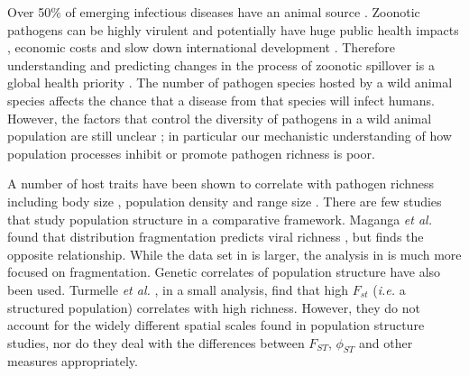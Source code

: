 Over 50\% of emerging infectious diseases have an animal source \cite{jones2008global, smith2014global}.
Zoonotic pathogens can be highly virulent \cite{luby2009recurrent, lefebvre2014case} and potentially have huge public health impacts \cite{granich2015trends}, economic costs \cite{knobler2004learning} and slow down international development \cite{ebolaWorldbank}.
Therefore understanding and predicting changes in the process of zoonotic spillover is a global health priority \cite{taylor2001risk}.
The number of pathogen species hosted by a wild animal species affects the chance that a disease from that species will infect humans.
However, the factors that control the diversity of pathogens in a wild animal population are still unclear \cite{metcalf2015five}; in particular our mechanistic understanding of how population processes inhibit or promote pathogen richness is poor.






A number of host traits have been shown to correlate with pathogen richness including body size \cite{kamiya2014determines, arneberg2002host}, population density \cite{nunn2003comparative, arneberg2002host} and range size \cite{bordes2011impact, kamiya2014determines}.
There are few studies that study population structure in a comparative framework.
Maganga \emph{et al.} found that distribution fragmentation predicts viral richness \cite{maganga2014bat}, but \cite{gay2014parasite} finds the opposite relationship. 
While the data set in \cite{gay2014parasite} is larger, the analysis in \cite{maganga2014bat} is much more focused on fragmentation.
Genetic correlates of population structure have also been used.
Turmelle \emph{et al.} \cite{turmelle2009correlates}, in a small analysis, find that high $F_{st}$ (\emph{i.e.} a structured population) correlates with high richness.
However, they do not account for the widely different spatial scales found in population structure studies, nor do they deal with the differences between $F_{ST}$, $\phi_{ST}$ and other measures appropriately. 

